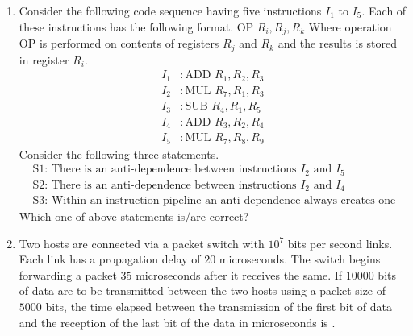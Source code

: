 \documentclass[journal,12pt,onecolumn]{IEEEtran}
\theoremstyle{remark}
\begin{document}
\begin{enumerate}
				\hfill{}
				
				\item Consider the following code sequence having five instructions $I_1$ to $I_5$. Each of these instructions has the following format.
				$\text{OP } R_i, R_j, R_k$
				Where operation OP is performed on contents of registers $R_j$ and $R_k$ and the results is stored in register $R_i$.
				\begin{align*}
					I_1 &\colon \text{ADD } R_1, R_2, R_3\\
					I_2 &\colon \text{MUL } R_7, R_1, R_3\\
					I_3 &\colon \text{SUB } R_4, R_1, R_5\\
					I_4 &\colon \text{ADD } R_3, R_2, R_4\\
					I_5 &\colon \text{MUL } R_7, R_8, R_9
				\end{align*}
				Consider the following three statements.
				\begin{align*}
					&\text{S1: There is an anti-dependence between instructions } I_2 \text{ and } I_5\\
					&\text{S2: There is an anti-dependence between instructions } I_2 \text{ and } I_4\\
					&\text{S3: Within an instruction pipeline an anti-dependence always creates one or more stalls}
				\end{align*}
				Which one of above statements is/are correct?
				
				\hfill{}
				
				\begin{enumerate}
				\end{enumerate}
				
				\item Two hosts are connected via a packet switch with $10^7$ bits per second links. Each link has a propagation delay of $20$ microseconds. The switch begins forwarding a packet $35$ microseconds after it receives the same. If $10000$ bits of data are to be transmitted between the two hosts using a packet size of $5000$ bits, the time elapsed between the transmission of the first bit of data and the reception of the last bit of the data in microseconds is \underline{\hspace{2cm}}.
				

\end{enumerate}
\end{document}
